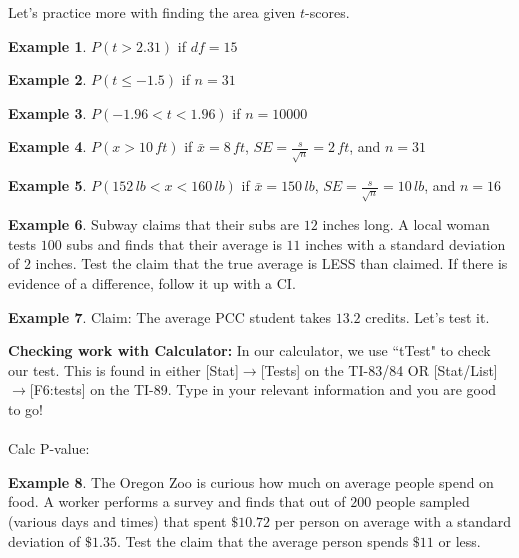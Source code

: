 \documentclass[12pt]{amsart}
\theoremstyle{definition}
\newtheorem{ex}{Example}
\begin{document}
\newpage
\noindent Let's practice more with finding the area given $t$-scores.

\begin{ex}
 $P(t>2.31)$ if $df=15$
\end{ex}
\vspace{0.4in}

\begin{ex}
 $P(t\leq -1.5)$ if $n=31$
\end{ex}
\vspace{0.4in}

\begin{ex}
 $P(-1.96<t<1.96)$ if $n=10000$
\end{ex}
\vspace{0.4in}

\begin{ex}
 $P(x>10\,ft)$ if $\bar{x}=8\,ft$, $SE=\frac{s}{\sqrt{n}}=2\,ft$, and $n=31$
\end{ex}
\vspace{1.5in}

\begin{ex}
$P(152\,lb<x<160\,lb)$ if $\bar{x}=150\,lb$, $SE=\frac{s}{\sqrt{n}}=10\,lb$, and $n=16$
\end{ex}
\vspace{1.5in}
\begin{ex} Subway claims that their subs are $12$ inches long. A local woman tests $100$ subs and finds that their average is $11$ inches with a standard deviation of $2$ inches. Test the claim that the true average is LESS than claimed. If there is evidence of a difference, follow it up with a CI.
\end{ex}
\vfill
\newpage
\begin{ex} Claim: The average PCC student takes $13.2$ credits. Let's test it.\end{ex}
\vfill
\noindent \textbf{Checking work with Calculator:} In our calculator, we use ``tTest" to check our test. This is found in either [Stat]$\rightarrow$[Tests] on the TI-83/84 OR [Stat/List]$\rightarrow$[F6:tests] on the TI-89. Type in your relevant information and you are good to go!\\
~\\
Calc P-value:
\newpage
\begin{ex}
	The Oregon Zoo is curious how much on average people spend on food. A worker performs a survey and finds that out of $200$ people sampled (various days and times) that spent $\$10.72$ per person on average with a standard deviation of $\$1.35$. Test the claim that the average person spends $\$11$ or less.
\end{ex}
\end{document}
